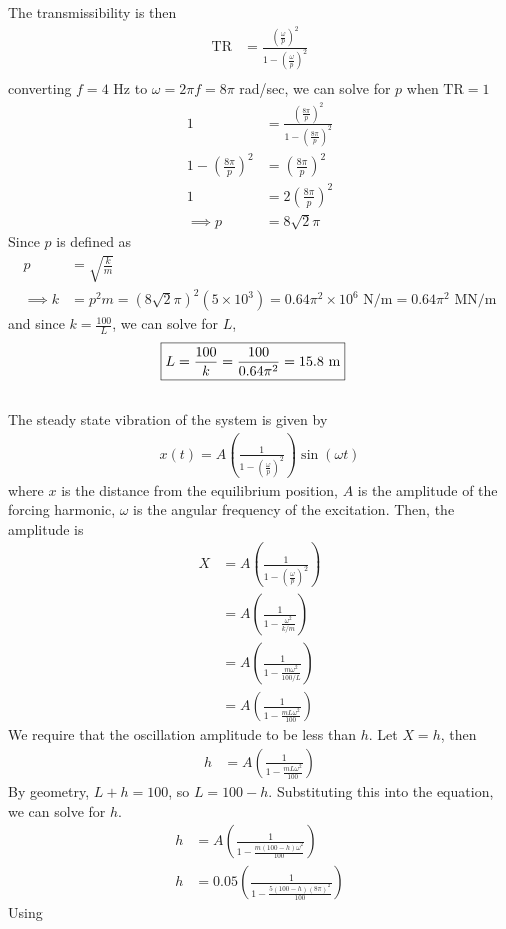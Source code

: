 The transmissibility is then
\begin{align*}
    \text{TR} &= \frac{\left(\frac{\omega}{p}\right)^2}{1 - \left(\frac{\omega}{p}\right)^2} \\
\end{align*}
converting $f = 4$ Hz to $\omega = 2\pi f = 8\pi$ rad/sec, we can solve for $p$ when $\text{TR} = 1$
\begin{align*}
    1 &= \frac{\left(\frac{8\pi}{p}\right)^2}{1 - \left(\frac{8\pi}{p}\right)^2} \\
    1 - \left(\frac{8\pi}{p}\right)^2 &= \left(\frac{8\pi}{p}\right)^2 \\
    1 &= 2\left(\frac{8\pi}{p}\right)^2 \\
    \implies p &= 8\sqrt{2} \pi
\end{align*}
Since $p$ is defined as 
\begin{align*}
    p &= \sqrt{\frac{k}{m}}\\
    \implies k &= p^2m = (8\sqrt{2}\pi)^2 (5 \times 10^3) = 0.64\pi^2 \times 10^6 \text{ N/m} = 0.64\pi^2 \text{ MN/m}
\end{align*}
and since $k = \frac{100}{L}$, we can solve for $L$,
\begin{align*}
    \Aboxed{L &= \frac{100}{k} = \frac{100}{0.64\pi^2} = 15.8 \text{ m}}
\end{align*}

\subsection{}
The steady state vibration of the system is given by
\begin{align*}
    x(t) = A\left(\frac{1}{1 - \left(\frac{\omega}{p}\right)^2}\right)\sin(\omega t)
\end{align*}
where $x$ is the distance from the equilibrium position, $A$ is the amplitude of the forcing harmonic, $\omega$ is the angular frequency of the excitation. Then, the amplitude is 
\begin{align*}
    X &= A \left(\frac{1}{1 - \left(\frac{\omega}{p}\right)^2}\right) \\
    &= A \left(\frac{1}{1 - \frac{\omega^2}{k/m}}\right) \\
    &= A \left(\frac{1}{1 - \frac{m \omega^2}{100/L}}\right) \\
    &= A \left(\frac{1}{1 - \frac{mL \omega^2}{100}}\right) 
\end{align*}
We require that the oscillation amplitude to be less than $h$. Let $X = h$, then
\begin{align*}
    h &= A \left(\frac{1}{1 - \frac{mL \omega^2}{100}}\right) 
\end{align*}
By geometry, $L+h = 100$, so $L = 100 - h$. Substituting this into the equation, we can solve for $h$.
\begin{align*}
    h &= A \left(\frac{1}{1 - \frac{m(100-h) \omega^2}{100}}\right) \\
    h &= 0.05 \left(\frac{1}{1 - \frac{5(100-h) (8\pi)^2}{100}}\right) 
\end{align*}
Using 

